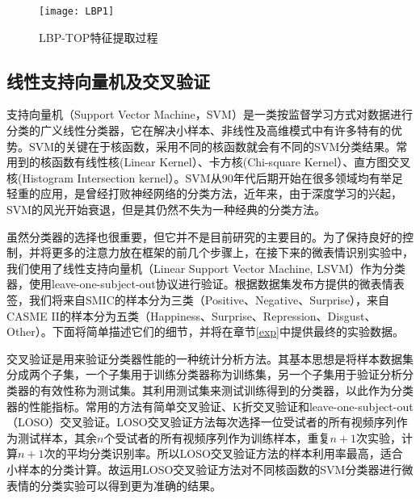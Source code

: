 \begin{figure}[!htbp]
    \centering
    \texttt{[image: LBP1]}
    \caption{LBP-TOP特征提取过程}
    \label{fig16}
\end{figure}

\subsection{线性支持向量机及交叉验证}

支持向量机（Support Vector Machine，SVM）是一类按监督学习方式对数据进行分类的广义线性分类器，它在解决小样本、非线性及高维模式中有许多特有的优势。SVM的关键在于核函数，采用不同的核函数就会有不同的SVM分类结果。常用到的核函数有线性核(Linear Kernel）、卡方核(Chi-square Kernel）、直方图交叉核(Histogram Intersection kernel）。SVM从90年代后期开始在很多领域均有举足轻重的应用，是曾经打败神经网络的分类方法，近年来，由于深度学习的兴起，SVM的风光开始衰退，但是其仍然不失为一种经典的分类方法。

虽然分类器的选择也很重要，但它并不是目前研究的主要目的。为了保持良好的控制，并将更多的注意力放在框架的前几个步骤上，在接下来的微表情识别实验中，我们使用了线性支持向量机（Linear Support Vector Machine, LSVM）作为分类器\citep{chang2011libsvm}，使用leave-one-subject-out协议进行验证。根据数据集发布方提供的微表情表签，我们将来自SMIC的样本分为三类（Positive、Negative、Surprise），来自CASME II的样本分为五类（Happiness、Surprise、Repression、Disgust、Other）。下面将简单描述它们的细节，并将在章节\ref{exp}中提供最终的实验数据。


交叉验证是用来验证分类器性能的一种统计分析方法。其基本思想是将样本数据集分成两个子集，一个子集用于训练分类器称为训练集，另一个子集用于验证分析分类器的有效性称为测试集。其利用测试集来测试训练得到的分类器，以此作为分类器的性能指标。常用的方法有简单交叉验证、K折交叉验证和leave-one-subject-out（LOSO）交叉验证。LOSO交叉验证方法每次选择一位受试者的所有视频序列作为测试样本，其余$n$个受试者的所有视频序列作为训练样本，重复$n+1$次实验，计算$n+1$次的平均分类识别率。所以LOSO交叉验证方法的样本利用率最高，适合小样本的分类计算。故运用LOSO交叉验证方法对不同核函数的SVM分类器进行微表情的分类实验可以得到更为准确的结果。

